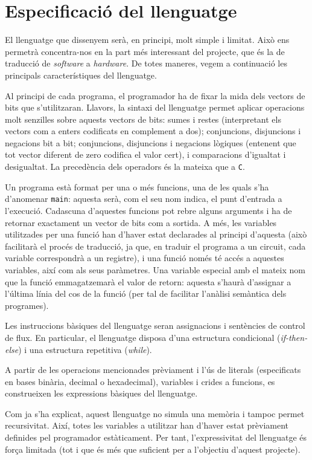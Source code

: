 
\section{Especificació del llenguatge}

El llenguatge que dissenyem serà, en principi, molt simple i limitat. Això ens 
permetrà concentra-nos en la part més interessant del projecte, que és la de 
traducció de \textit{software} a \textit{hardware}. De totes maneres, vegem 
a continuació les principals característiques del llenguatge.

Al principi de cada programa, el programador ha de fixar la mida dels vectors 
de bits que s'utilitzaran. Llavors, la sintaxi del llenguatge permet aplicar 
operacions molt senzilles sobre aquests vectors de bits: sumes i restes 
(interpretant els vectors com a enters codificats en complement a dos); 
conjuncions, disjuncions i negacions bit a bit; conjuncions, disjuncions i 
negacions lògiques (entenent que tot vector diferent de zero codifica el valor 
cert), i comparacions d'igualtat i desigualtat. La precedència dels operadors 
és la mateixa que a \texttt{C}.

Un programa està format per una o més funcions, una de les quals s'ha 
d'anomenar \texttt{main}: aquesta serà, com el seu nom indica, el punt 
d'entrada a l'execució. Cadascuna d'aquestes funcions pot rebre alguns 
arguments i ha de retornar exactament un vector de bits com a sortida. A més, 
les variables utilitzades per una funció han d'haver estat declarades al 
principi d'aquesta (això facilitarà el procés de traducció, ja que, en traduir 
el programa a un circuit, cada variable correspondrà a un registre), i una 
funció només té accés a aquestes variables, així com als seus paràmetres. Una 
variable especial amb el mateix nom que la funció emmagatzemarà el valor de 
retorn: aquesta s'haurà d'assignar a l'última línia del cos de la funció (per 
tal de facilitar l'anàlisi semàntica dels programes). 

Les instruccions bàsiques del llenguatge seran assignacions i sentències de 
control de flux. En particular, el llenguatge disposa d'una estructura 
condicional (\textit{if-then-else}) i una estructura repetitiva 
(\textit{while}). 

A partir de les operacions mencionades prèviament i l'ús de literals 
(especificats en bases binària, decimal o hexadecimal), variables i crides a 
funcions, es construeixen les expressions bàsiques del llenguatge.

Com ja s'ha explicat, aquest llenguatge no simula una memòria i tampoc permet 
recursivitat. Així, totes les variables a utilitzar han d'haver estat 
prèviament definides pel programador estàticament. Per tant, l'expressivitat 
del llenguatge és força limitada (tot i que és més que suficient per a 
l'objectiu d'aquest projecte).

